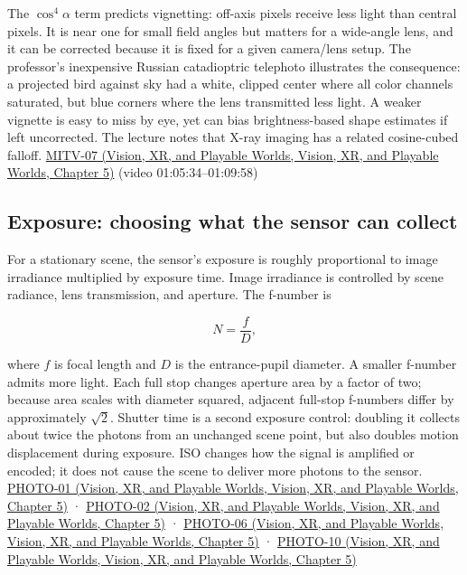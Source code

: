 The \(\cos^4\alpha\) term predicts vignetting: off-axis pixels receive less light than central pixels. It is near one for small field angles but matters for a wide-angle lens, and it can be corrected because it is fixed for a given camera/lens setup. The professor's inexpensive Russian catadioptric telephoto illustrates the consequence: a projected bird against sky had a white, clipped center where all color channels saturated, but blue corners where the lens transmitted less light. A weaker vignette is easy to miss by eye, yet can bias brightness-based shape estimates if left uncorrected. The lecture notes that X-ray imaging has a related cosine-cubed falloff. \href{../07-Vision-XR-and-Playable-Worlds/main.pdf\#nameddest=04-visual-computing-ii-ch036-mitv-07---gradient-space-reflectance-map-image-irradiance-equation-gnomonic-projection}{MITV-07 (Vision, XR, and Playable Worlds, Vision, XR, and Playable Worlds, Chapter 5)} (video 01:05:34--01:09:58)

\subsection{Exposure: choosing what the sensor can collect}\label{03-visual-computing-i-ch003-exposure-choosing-what-the-sensor-can-collect}

For a stationary scene, the sensor's exposure is roughly proportional to image irradiance multiplied by exposure time. Image irradiance is controlled by scene radiance, lens transmission, and aperture. The f-number is

\[
N=\frac{f}{D},
\]

where \(f\) is focal length and \(D\) is the entrance-pupil diameter. A smaller f-number admits more light. Each full stop changes aperture area by a factor of two; because area scales with diameter squared, adjacent full-stop f-numbers differ by approximately \(\sqrt 2\). Shutter time is a second exposure control: doubling it collects about twice the photons from an unchanged scene point, but also doubles motion displacement during exposure. ISO changes how the signal is amplified or encoded; it does not cause the scene to deliver more photons to the sensor. \href{../07-Vision-XR-and-Playable-Worlds/main.pdf\#nameddest=04-visual-computing-ii-ch036-photo-01---photography-session-01}{PHOTO-01 (Vision, XR, and Playable Worlds, Vision, XR, and Playable Worlds, Chapter 5)} · \href{../07-Vision-XR-and-Playable-Worlds/main.pdf\#nameddest=04-visual-computing-ii-ch036-photo-02---photography-session-02}{PHOTO-02 (Vision, XR, and Playable Worlds, Vision, XR, and Playable Worlds, Chapter 5)} · \href{../07-Vision-XR-and-Playable-Worlds/main.pdf\#nameddest=04-visual-computing-ii-ch036-photo-06---photography-session-06}{PHOTO-06 (Vision, XR, and Playable Worlds, Vision, XR, and Playable Worlds, Chapter 5)} · \href{../07-Vision-XR-and-Playable-Worlds/main.pdf\#nameddest=04-visual-computing-ii-ch036-photo-10---photography-session-10}{PHOTO-10 (Vision, XR, and Playable Worlds, Vision, XR, and Playable Worlds, Chapter 5)}

